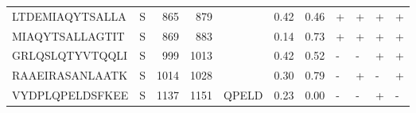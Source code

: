 \begin{tabular}{llrrlrrllll}
LTDEMIAQYTSALLA &       S &    865 &   879 &                     &            0.42 &             0.46 &      + &       + &      + &       + \\
MIAQYTSALLAGTIT &       S &    869 &   883 &                     &            0.14 &             0.73 &      + &       + &      + &       + \\
GRLQSLQTYVTQQLI &       S &    999 &  1013 &                     &            0.42 &             0.52 &      - &       - &      + &       + \\
RAAEIRASANLAATK &       S &   1014 &  1028 &                     &            0.30 &             0.79 &      - &       + &      - &       + \\
VYDPLQPELDSFKEE &       S &   1137 &  1151 &               QPELD &            0.23 &             0.00 &      - &       - &      + &       - \\
\bottomrule
\end{tabular}
